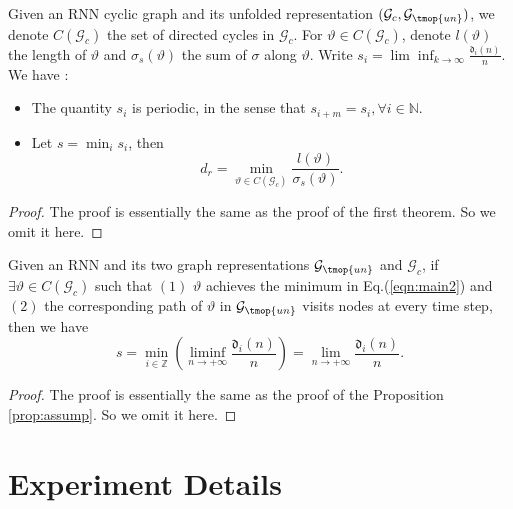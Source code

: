 \begin{thm}
\label{thm:main2}
  Given an RNN cyclic graph and its unfolded representation $(\mathcal{G}_c,
  \mathcal{G}_{\tmop{un}})$, we denote $C (\mathcal{G}_c)$ the set of directed
  cycles in $\mathcal{G}_c$. For $\vartheta \in C (\mathcal{G}_c)$, denote $l
  (\vartheta)$ the length of $\vartheta$ and $\sigma_s (\vartheta)$ the sum of
  $\sigma$ along $\vartheta$. Write $s_i = \lim \inf_{k \rightarrow \infty}
  \frac{\mathfrak{d}_i (n)}{n}$. We have :
  \begin{itemize}
    \item  The quantity $s_i$ is periodic, in the sense that $s_{i + m} = s_i,
    \forall i \in \mathbb{N}$.
    
    \item Let $s = \min_i s_i$, then
    \begin{equation}
    \label{eqn:main2}
        d_r = \min_{\vartheta \in C (\mathcal{G}_c)} \frac{l
       (\vartheta)}{\sigma_s (\vartheta)}.
    \end{equation}
  \end{itemize}
\end{thm}
\begin{proof}
  The proof is essentially the same as the proof of the first theorem. So we
  omit it here. 
\end{proof}

\begin{proposition}
\label{prop:assump2}
  Given an RNN and its two graph representations $\mathcal{G}_{\tmop{un}}$ and
  $\mathcal{G}_c$, if $\exists \vartheta \in C (\mathcal{G}_c)$ such that
  $(1)$ $\vartheta$ achieves the minimum in Eq.(\ref{eqn:main2}) and $(2)$ the
  corresponding path of $\vartheta$ in $\mathcal{G}_{\tmop{un}}$ visits nodes at every time step,
  then we have
  \[ s = \min_{i \in \mathbb{Z}} \left( \liminf_{n \rightarrow + \infty}
     \frac{\mathfrak{d}_i (n)}{n} \right) = \lim_{n \rightarrow + \infty}
     \frac{\mathfrak{d}_i (n)}{n}. \]
\end{proposition}
\begin{proof}
  The proof is essentially the same as the proof of the Proposition \ref{prop:assump}. So we
  omit it here. 
\end{proof}

\newpage



\newpage
\section{Experiment Details}

